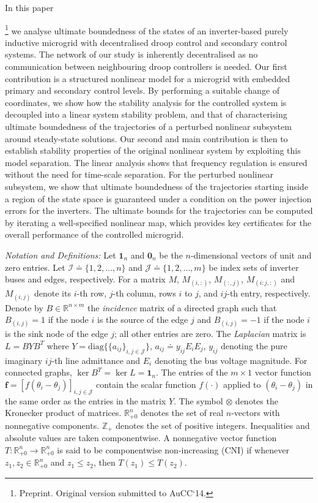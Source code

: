 \documentclass[letter, 10pt, conference]{ieeeconf}
\newcommand{\R}{\mathbb{R}}
\newcommand{\Z}{\mathbb{Z}}
\newcommand{\I}{\mathcal{I}}
\newcommand{\J}{\mathcal{J}}
\newcommand{\1}{\mathbf{1}}
\newcommand{\0}{\mathbf{0}}
\begin{document}
In this paper{\footnote{Preprint. Original version submitted to AuCC`14.}
 we analyse ultimate boundedness of the states of an
inverter-based purely inductive microgrid with decentralised droop
control and secondary control systems.
The network of our study is inherently decentralised as no communication between
neighbouring droop controllers is needed.
Our first contribution is a structured nonlinear model for a microgrid
with embedded primary and secondary control levels.  
By performing a suitable change of coordinates, we show how the
stability analysis for the controlled system is decoupled into a
linear system stability problem, and that of characterising
ultimate boundedness of the trajectories of a perturbed nonlinear
subsystem around steady-state solutions. Our second and main
contribution is then to establish stability properties of the original
nonlinear system by exploiting this model separation.  The linear
analysis shows that frequency regulation
is ensured without the need for time-scale separation.  For the
perturbed nonlinear subsystem, we show that ultimate boundedness of
the trajectories starting inside a region of the state space is
guaranteed under a condition on the power injection errors for the
inverters. The ultimate bounds for the trajectories can be computed by
iterating a well-specified nonlinear map, which provides key
certificates for the overall performance of the controlled microgrid.





\emph{Notation and Definitions:} Let $\mathbf{1}_n$ and $\mathbf{0}_n$
be the $n$-dimensional vectors of unit and zero entries.  Let $\I
\doteq \{1,2,\dots,n\}$
and $\J \doteq \{1,2,\dots,m\}$ be 
index sets of inverter buses and edges, respectively.  For a matrix
$M$, $M_{(i,:)}$, $M_{(:,j)}$, $M_{(i:j,:)}$ and $M_{(i,j)}$ denote
its $i$-th row, $j$-th column, rows $i$ to $j$, and $ij$-th entry,
respectively.  Denote by $B\in\R^{n \times m}$ the \emph{incidence}
matrix of a directed graph such that $B_{(i,j)}=1$ if the node $i$ is
the source of the edge $j$ and $B_{(i,j)}=-1$ if the node $i$ is the
sink node of the edge $j$; all other entries are zero.  The
\emph{Laplacian} matrix is $L=BYB^T$ where
$Y=\mathrm{diag}\{\{a_{ij}\}_{i,j\in\J}\}$, $a_{ij} \doteq y_{ij} E_i
E_j$, $y_{ij}$ denoting the pure imaginary $ij$-th line admittance and
$E_i$ denoting the bus voltage magnitude.  For connected graphs, $\ker
B^T = \ker L = \1_n$. The entries of the $m \times 1$ vector function
$\mathbf{f}=[f(\theta_i-\theta_j)]_{i,j\in\J}$ contain the scalar
function $f(\cdot)$ applied to $(\theta_i-\theta_j)$ in the same order
as the entries in the matrix $Y$. The symbol $\otimes$ denotes the
Kronecker product of matrices.  $\R_{+0}^n$ denotes the set of real $n$-vectors with nonnegative
components. $\Z_+$ denotes the set of positive integers.
Inequalities and absolute values are taken componentwise.
A nonnegative vector function $T:\R_{+0}^n \to \R_{+0}^n$ is said to
be componentwise non-increasing (CNI) if whenever
$z_1,z_2\in\R_{+0}^n$ and $z_1 \le z_2$, then $T(z_1)\le T(z_2)$.




}
\end{document}
